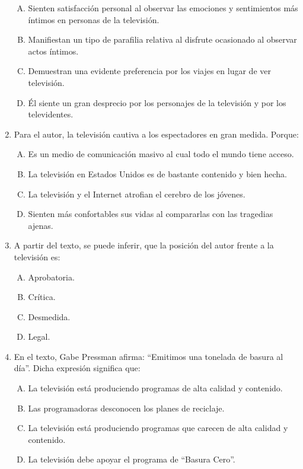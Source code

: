 \begin{enumerate}
\begin{enumerate}[(A)]
\item Sienten satisfacción personal al observar las emociones y sentimientos más íntimos en personas de la televisión.
\item Manifiestan un tipo de parafilia relativa al disfrute ocasionado al observar actos íntimos.
\item Demuestran una evidente preferencia por los viajes en lugar de ver televisión.
\item Él siente un gran desprecio por los personajes de la televisión y por los televidentes.
\end{enumerate}
\item Para el autor, la televisión cautiva a los espectadores en gran medida. Porque: \label{lit-12}

\begin{enumerate}[(A)]
\item Es un medio de comunicación masivo al cual todo el mundo tiene acceso.
\item La televisión en Estados Unidos es de bastante contenido y bien hecha.
\item La televisión y el Internet atrofian el cerebro de los jóvenes.
\item Sienten más confortables sus vidas al compararlas con las tragedias ajenas. 
\end{enumerate}
\item A partir del texto, se puede inferir, que la posición del autor frente a la televisión es: \label{lit-13}

\begin{enumerate}[(A)]
\item Aprobatoria.
\item Crítica.
\item Desmedida.
\item Legal.
\end{enumerate}
\item En el texto, Gabe Pressman afirma: ``Emitimos una tonelada de basura al día''. Dicha expresión significa que: \label{lit-14}


\begin{enumerate}[(A)]
\item La televisión está produciendo programas de alta calidad y contenido.
\item Las programadoras desconocen los planes de reciclaje.
\item La televisión está produciendo programas que carecen de alta calidad y contenido.
\item La televisión debe apoyar el programa de ``Basura Cero''.
\end{enumerate}




\end{enumerate}
